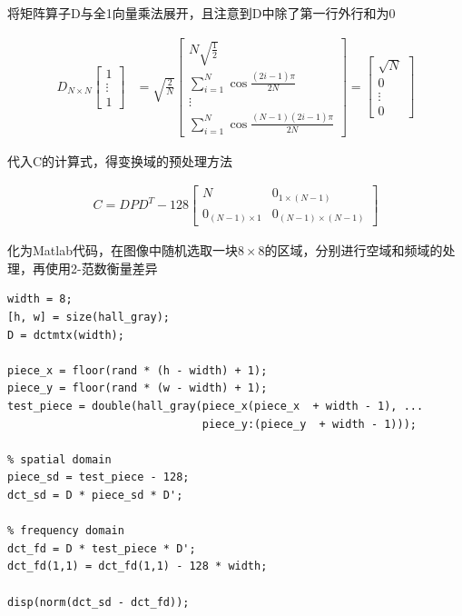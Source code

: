 \documentclass[10pt, a4paper]{article}
\begin{document}
将矩阵算子D与全1向量乘法展开，且注意到D中除了第一行外行和为0

\begin{align*}
    D_{N\times N}
    \begin{bmatrix}
        1      \\
        \vdots \\
        1
    \end{bmatrix}
     & =
    \sqrt{\frac{2}{N}}
    \begin{bmatrix}
        N\sqrt{\frac{1}{2}}                      \\
        \sum_{i=1}^N\cos{\frac{(2i - 1)\pi}{2N}} \\
        \vdots                                   \\
        \sum_{i=1}^N\cos{\frac{(N - 1)(2i - 1)\pi}{2N}}
    \end{bmatrix}
    =
    \begin{bmatrix}
        \sqrt{N} \\
        0        \\
        \vdots   \\
        0
    \end{bmatrix}
\end{align*}

代入C的计算式，得变换域的预处理方法

\begin{align*}
    C = DPD^T - 128
    \begin{bmatrix}
        N                 & 0_{1\times (N-1)}    \\
        0_{(N-1)\times 1} & 0_{(N-1)\times(N-1)}
    \end{bmatrix}
\end{align*}

化为Matlab代码，在图像中随机选取一块$8\times 8$的区域，分别进行空域和频域的处理，再使用2-范数衡量差异

\begin{verbatim}
width = 8;
[h, w] = size(hall_gray);
D = dctmtx(width);

piece_x = floor(rand * (h - width) + 1);
piece_y = floor(rand * (w - width) + 1);
test_piece = double(hall_gray(piece_x(piece_x  + width - 1), ...
                              piece_y:(piece_y  + width - 1)));

% spatial domain
piece_sd = test_piece - 128;
dct_sd = D * piece_sd * D';

% frequency domain
dct_fd = D * test_piece * D';
dct_fd(1,1) = dct_fd(1,1) - 128 * width;

disp(norm(dct_sd - dct_fd));
\end{verbatim}
\end{document}

